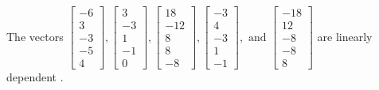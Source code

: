 \begin{exercise}
\begin{exerciseStatement}
  \end{exerciseStatement}
  \begin{exerciseAnswer}
   The vectors \(\left[\begin{array}{r}
-6 \\
3 \\
-3 \\
-5 \\
4
\end{array}\right] , \left[\begin{array}{r}
3 \\
-3 \\
1 \\
-1 \\
0
\end{array}\right] , \left[\begin{array}{r}
18 \\
-12 \\
8 \\
8 \\
-8
\end{array}\right] , \left[\begin{array}{r}
-3 \\
4 \\
-3 \\
1 \\
-1
\end{array}\right] , \text{ and } \left[\begin{array}{r}
-18 \\
12 \\
-8 \\
-8 \\
8
\end{array}\right]\) are 
  	 linearly dependent  .
  


  \end{exerciseAnswer}
\end{exercise}